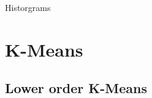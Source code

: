 \documentclass[11pt]{beamer}
\begin{document}
\begin{frame}{Historgrams}
\begin{center}
\end{center}
\end{frame}


\section{K-Means}
\subsection{Lower order K-Means}
\end{document}
